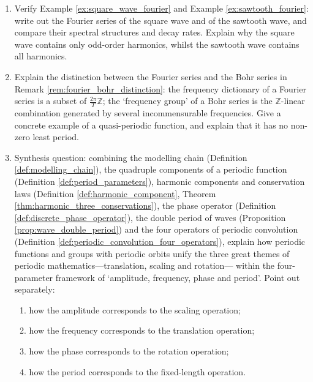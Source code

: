 \begin{enumerate}[leftmargin=3em, label=\textbf{Exercise \arabic*}]
    \item Verify Example \ref{ex:square_wave_fourier} and Example \ref{ex:sawtooth_fourier}:
    write out the Fourier series of the square wave and of the sawtooth wave, and compare their spectral structures and decay rates. Explain why the square wave contains only odd-order harmonics, whilst the sawtooth wave contains all harmonics.

    \item Explain the distinction between the Fourier series and the Bohr series in Remark \ref{rem:fourier_bohr_distinction}:
    the frequency dictionary of a Fourier series is a subset of $\frac{2\pi}{T}\mathbb{Z}$;
    the `frequency group' of a Bohr series is the $\mathbb{Z}$-linear combination generated by several incommensurable frequencies.
    Give a concrete example of a quasi-periodic function, and explain that it has no non-zero least period.

    \item Synthesis question: combining the modelling chain (Definition \ref{def:modelling_chain}),
    the quadruple components of a periodic function (Definition \ref{def:period_parameters}),
    harmonic components and conservation laws (Definition \ref{def:harmonic_component}, Theorem \ref{thm:harmonic_three_conservations}),
    the phase operator (Definition \ref{def:discrete_phase_operator}),
    the double period of waves (Proposition \ref{prop:wave_double_period})
    and the four operators of periodic convolution (Definition \ref{def:periodic_convolution_four_operators}),
    explain how periodic functions and groups with periodic orbits unify the three great themes of periodic mathematics---translation, scaling and rotation---
    within the four-parameter framework of `amplitude, frequency, phase and period'.
    Point out separately:
    \begin{enumerate}[label=(\roman*)]
        \item how the amplitude corresponds to the scaling operation;
        \item how the frequency corresponds to the translation operation;
        \item how the phase corresponds to the rotation operation;
        \item how the period corresponds to the fixed-length operation.
    \end{enumerate}
\end{enumerate}

